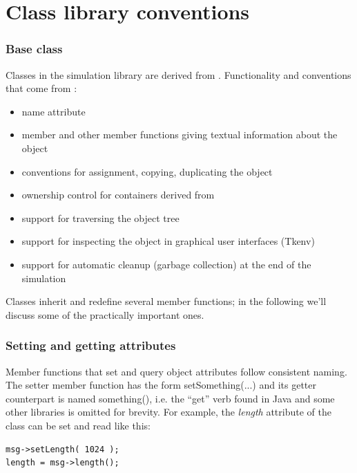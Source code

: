 \section{Class library conventions}

\subsubsection{Base class}
\label{sec:ch-sim-lib:cObject}


Classes in the {\opp} simulation library are derived from .
Functionality and conventions that come from :
\begin{itemize}
  \item{name attribute}
  \item{ member and other member functions giving textual
    information about the object}
  \item{conventions for assignment, copying, duplicating the object}
  \item{ownership control for containers derived from }
  \item{support for traversing the object tree}
  \item{support for inspecting the object in graphical user interfaces
    (Tkenv)}
  \item{support for automatic cleanup (garbage collection) at the end
    of the simulation}
\end{itemize}


Classes inherit and redefine several  member functions;
in the following we'll discuss some of the practically important
ones.


\subsubsection{Setting and getting attributes}


Member functions that set and query object attributes follow
consistent naming. The setter member function has the form setSomething(...)
and its getter counterpart is named something(), i.e. the ``get''
verb found in Java and some other libraries is omitted for brevity.
For example, the \textit{length} attribute of the  class can
be set and read like this:

\begin{verbatim}
msg->setLength( 1024 );
length = msg->length();
\end{verbatim}


